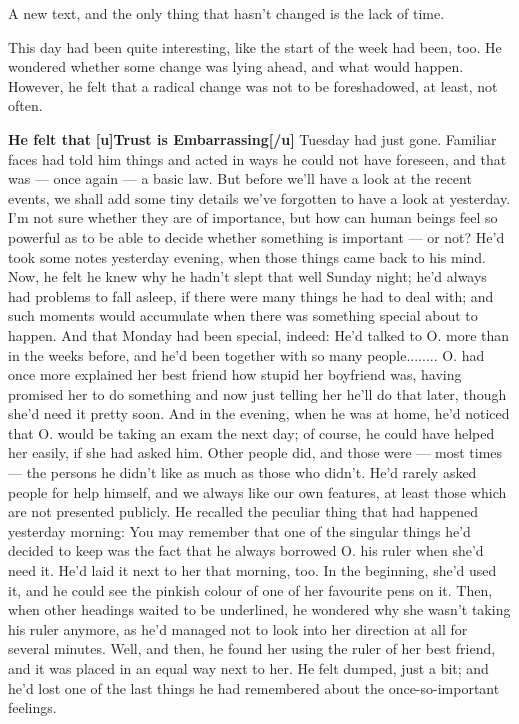 A new text, and the only thing that hasn't changed is the lack of time. 

This day had been quite interesting, like the start of the week had been, too. He wondered whether some change was lying ahead, and what would happen. However, he felt that a radical change was not to be foreshadowed, at least, not often. 

\textbf{He felt that}
\textbf{[u]Trust is Embarrassing[/u]}
Tuesday had just gone. Familiar faces had told him things and acted in ways he could not have foreseen, and that was --- once again --- a basic law. But before we'll have a look at the recent events, we shall add some tiny details we've forgotten to have a look at yesterday. I'm not sure whether they are of importance, but how can human beings feel so powerful as to be able to decide whether something is important --- or not?
He'd took some notes yesterday evening, when those things came back to his mind. Now, he felt he knew why he hadn't slept that well Sunday night; he'd always had problems to fall asleep, if there were many things he had to deal with; and such moments would accumulate when there was something special about to happen. And that Monday had been special, indeed: He'd talked to O. more than in the weeks before, and he'd been together with so many people........
O. had once more explained her best friend how stupid her boyfriend was, having promised her to do something and now just telling her he'll do that later, though she'd need it pretty soon. And in the evening, when he was at home, he'd noticed that O. would be taking an exam the next day; of course, he could have helped her easily, if she had asked him. Other people did, and those were --- most times --- the persons he didn't like as much as those who didn't. He'd rarely asked people for help himself, and we always like our own features, at least those which are not presented publicly. 
He recalled the peculiar thing that had happened yesterday morning: You may remember that one of the singular things he'd decided to keep was the fact that he always borrowed O. his ruler when she'd need it. He'd laid it next to her that morning, too. In the beginning, she'd used it, and he could see the pinkish colour of one of her favourite pens on it. Then, when other headings waited to be underlined, he wondered why she wasn't taking his ruler anymore, as he'd managed not to look into her direction at all for several minutes. 
Well, and then, he found her using the ruler of her best friend, and it was placed in an equal way next to her. 
He felt dumped, just a bit; and he'd lost one of the last things he had remembered about the once-so-important feelings. 
